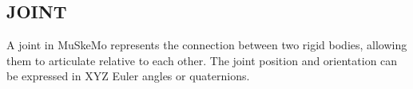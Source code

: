 \documentclass{article}
\begin{document}








\subsection{JOINT}

A joint in MuSkeMo represents the connection between two rigid bodies, allowing them to articulate relative to each other. The joint position and orientation can be expressed in XYZ Euler angles or quaternions.
\end{document}
